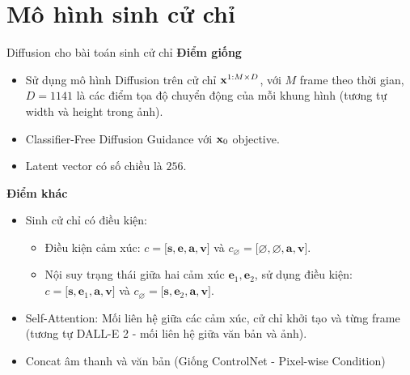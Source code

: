 
\section{Mô hình sinh cử chỉ}

%


\begin{frame}{Diffusion cho bài toán sinh cử chỉ}
	\textbf{Điểm giống}
	\begin{itemize}
		\item Sử dụng mô hình Diffusion \cite{yang2023diffusestylegesture} trên cử chỉ $\mathbf{x}^{1:M \times D}$,  với $M$ frame theo thời gian, $D=1141$ là các điểm tọa độ chuyển động của mỗi khung hình (tương tự width và height trong ảnh).
		\item Classifier-Free Diffusion Guidance với $\mathbf{x}_0$ objective.
		\item Latent vector có số chiều là $256$.
		\end{itemize}
		
		\textbf{Điểm khác}
		
		\begin{itemize}
			\item Sinh cử chỉ có điều kiện:
			\begin{itemize}
				\item Điều kiện cảm xúc: $c = \big[ \mathbf{s}, \mathbf{e}, \mathbf{a}, \mathbf{v} \big]$ và $c_{\varnothing} = \big[ \varnothing, \varnothing, \mathbf{a}, \mathbf{v}\big]$.
				\item Nội suy trạng thái giữa hai cảm xúc $\mathbf{e}_1, \mathbf{e}_2$, sử dụng điều kiện: $c = \big[ \mathbf{s}, \mathbf{e}_1, \mathbf{a}, \mathbf{v} \big]$ và $c_{\varnothing} = \big[ \mathbf{s}, \mathbf{e}_2, \mathbf{a}, \mathbf{v} \big]$.
			\end{itemize}
			\item Self-Attention: Mối liên hệ giữa các cảm xúc, cử chỉ khởi tạo và từng frame (tương tự DALL-E 2 - mối liên hệ giữa văn bản và ảnh).
			\item Concat âm thanh và văn bản (Giống ControlNet - Pixel-wise Condition)
		\end{itemize}
\end{frame}

